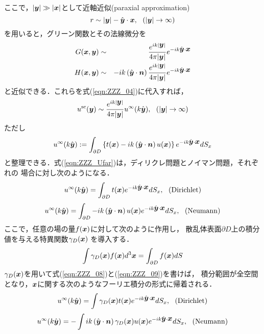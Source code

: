 ここで，$\left|\mbox{\boldmath $y$}\right|\gg \left| \mbox{\boldmath $x$} \right|$として近軸近似(paraxial approximation)
\begin{equation}
	r\sim  |\fat{y}|  -\hat{\fat{y}}\cdot \fat{x}, \ \ ( |\fat{y}|\rightarrow \infty)
	\label{eqn:ZZZ_para}
\end{equation}
を用いると，グリーン関数とその法線微分を
\begin{eqnarray}
	G(\mbox{\boldmath $x$},\mbox{\boldmath $y$}) &\sim&
	\frac{e^{ik|\mbox{\boldmath $y$}|}}{4\pi |\mbox{\boldmath $y$}|} 
	e^{-ik\hat{\mbox{\boldmath $y$}}\cdot \mbox{\boldmath $x$}}
	\label{eqn:ZZZ_Gfar}
	\\ 
	H(\mbox{\boldmath $x$},\mbox{\boldmath $y$}) &\sim&
	-ik \left( \hat{\mbox{\boldmath $y$}}\cdot\mbox{\boldmath $n$}  \right)
	\frac{e^{ik|\mbox{\boldmath $y$}|}}{4\pi |\mbox{\boldmath $y$}|} 
	e^{-ik\hat{\mbox{\boldmath $y$}}\cdot \mbox{\boldmath $x$}}
	\label{eqn:ZZZ_Hfar}
\end{eqnarray}
と近似できる．これらを式(\ref{eqn:ZZZ_04})に代入すれば，
\begin{equation}
	u^{\rm sc}(\fat{y}) \sim \frac{e^{ik|\fat{y}|}}{4\pi |\fat{y}|} u^{\infty}(k\hat{\fat{y}}), \ \ 
	(|\fat{y}|\rightarrow \infty)
	\label{eqn:ZZZ_07}
\end{equation}
ただし
\begin{equation}
	u^{\infty}(k\hat{\mbox{\boldmath $y$}}) 
	:=
	\int_{\partial D}
	\left\{t(\mbox{\boldmath $x$})-ik \left( \hat{\mbox{\boldmath $y$}}\cdot \mbox{\boldmath $n$}\right) u(\mbox{\boldmath $x$}) \right\}
	e^{-ik\hat{\mbox{\boldmath $y$}}\cdot \mbox{\boldmath $x$}}
	dS_x
	\label{eqn:ZZZ_Ufar}
\end{equation}
と整理できる．式(\ref{eqn:ZZZ_Ufar})は，ディリクレ問題とノイマン問題，それぞれの
場合に対し次のようになる．
\begin{equation}
	u^{\infty}(k\hat{\mbox{\boldmath $y$}})  
	= \int _{\partial D} t(\mbox{\boldmath $x$})e^{-ik\hat{\mbox{\boldmath $y$}}\cdot \mbox{\boldmath $x$}} dS_x
	, \ \ ( {\rm Dirichlet})
	\label{eqn:ZZZ_08}
\end{equation}
\begin{equation}
	u^{\infty}(k\hat{\mbox{\boldmath $y$}})  =
	\int _{\partial D} 
	-ik\left(\hat{\mbox{\boldmath $y$}}\cdot \mbox{\boldmath $n$}\right) 
	u(\mbox{\boldmath $x$})e^{-ik\hat{\mbox{\boldmath $y$}}\cdot \mbox{\boldmath $x$}} dS_x
	, \ \ ({\rm Neumann})
	\label{eqn:ZZZ_09}
\end{equation}
ここで，任意の場の量$f(\mbox{\boldmath $x$})$に対して次のように作用し，
散乱体表面$\partial D$上の積分値を与える特異関数$\gamma_D(\mbox{\boldmath $x$})$
を導入する．
\begin{equation}
	\int \gamma_D(\mbox{\boldmath $x$})f(\mbox{\boldmath $x$})d^3\mbox{\boldmath $x$} =\int _{\partial D} f(\mbox{\boldmath $x$}) dS
	\label{eqn:ZZZ_10}
\end{equation}
$\gamma_D(\mbox{\boldmath $x$})$を用いて式(\ref{eqn:ZZZ_08})と(\ref{eqn:ZZZ_09})を書けば，
積分範囲が全空間となり，$\mbox{\boldmath $x$}$に関する次のようなフーリエ積分の形式に帰着される．
\begin{equation}
	u^{\infty}(k\hat{\mbox{\boldmath $y$}})  = \int \gamma_D(\mbox{\boldmath $x$})t(\mbox{\boldmath $x$})e^{-ik\hat{\mbox{\boldmath $y$}}\cdot \mbox{\boldmath $x$}} dS_x
	, \ \ ( {\rm Dirichlet})
	\label{eqn:ZZZ_11}
\end{equation}
\begin{equation}
	u^{\infty}(k\hat{\mbox{\boldmath $y$}})  =-\int 
	ik\left(\hat{\mbox{\boldmath $y$}}\cdot \mbox{\boldmath $n$}\right) 
	\gamma_D(\mbox{\boldmath $x$})u(\mbox{\boldmath $x$})e^{-ik\hat{\mbox{\boldmath $y$}}\cdot \mbox{\boldmath $x$}} dS_x
	, \ \ ({\rm Neumann})
	\label{eqn:ZZZ_12}
\end{equation}
